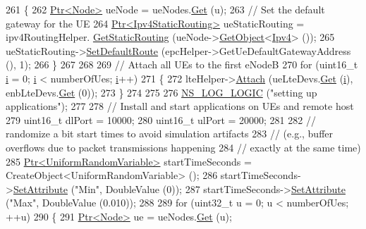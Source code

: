 \begin{DoxyCode}
261     \{
262       \hyperlink{classns3_1_1Ptr}{Ptr<Node>} ueNode = ueNodes.\hyperlink{classns3_1_1NodeContainer_a9ed96e2ecc22e0f5a3d4842eb9bf90bf}{Get} (u);
263       \textcolor{comment}{// Set the default gateway for the UE}
264       \hyperlink{classns3_1_1Ptr}{Ptr<Ipv4StaticRouting>} ueStaticRouting = ipv4RoutingHelper.
      \hyperlink{classns3_1_1Ipv4StaticRoutingHelper_a731206e50d305695dac7fb2ef963a4bb}{GetStaticRouting} (ueNode->\hyperlink{classns3_1_1Object_a13e18c00017096c8381eb651d5bd0783}{GetObject}<\hyperlink{classns3_1_1Ipv4}{Ipv4}> ());
265       ueStaticRouting->\hyperlink{classns3_1_1Ipv4StaticRouting_aee30fa3246c2b42f122dabdff2725331}{SetDefaultRoute} (epcHelper->GetUeDefaultGatewayAddress (), 1);
266     \}
267 
268 
269   \textcolor{comment}{// Attach all UEs to the first eNodeB}
270   \textcolor{keywordflow}{for} (uint16\_t \hyperlink{bernuolliDistribution_8m_a6f6ccfcf58b31cb6412107d9d5281426}{i} = 0; \hyperlink{bernuolliDistribution_8m_a6f6ccfcf58b31cb6412107d9d5281426}{i} < numberOfUes; \hyperlink{bernuolliDistribution_8m_a6f6ccfcf58b31cb6412107d9d5281426}{i}++)
271     \{
272       lteHelper->\hyperlink{classns3_1_1LteHelper_a9466743f826aa2652a87907b7f0a1c87}{Attach} (ueLteDevs.\hyperlink{classns3_1_1NetDeviceContainer_a677d62594b5c9d2dea155cc5045f4d0b}{Get} (\hyperlink{bernuolliDistribution_8m_a6f6ccfcf58b31cb6412107d9d5281426}{i}), enbLteDevs.\hyperlink{classns3_1_1NetDeviceContainer_a677d62594b5c9d2dea155cc5045f4d0b}{Get} (0));
273     \}
274 
275 
276   \hyperlink{group__logging_ga88acd260151caf2db9c0fc84997f45ce}{NS\_LOG\_LOGIC} (\textcolor{stringliteral}{"setting up applications"});
277 
278   \textcolor{comment}{// Install and start applications on UEs and remote host}
279   uint16\_t dlPort = 10000;
280   uint16\_t ulPort = 20000;
281 
282   \textcolor{comment}{// randomize a bit start times to avoid simulation artifacts}
283   \textcolor{comment}{// (e.g., buffer overflows due to packet transmissions happening}
284   \textcolor{comment}{// exactly at the same time)}
285   \hyperlink{classns3_1_1Ptr}{Ptr<UniformRandomVariable>} startTimeSeconds = 
      CreateObject<UniformRandomVariable> ();
286   startTimeSeconds->\hyperlink{classns3_1_1ObjectBase_ac60245d3ea4123bbc9b1d391f1f6592f}{SetAttribute} (\textcolor{stringliteral}{"Min"}, DoubleValue (0));
287   startTimeSeconds->\hyperlink{classns3_1_1ObjectBase_ac60245d3ea4123bbc9b1d391f1f6592f}{SetAttribute} (\textcolor{stringliteral}{"Max"}, DoubleValue (0.010));
288 
289   \textcolor{keywordflow}{for} (uint32\_t u = 0; u < numberOfUes; ++u)
290     \{
291       \hyperlink{classns3_1_1Ptr}{Ptr<Node>} ue = ueNodes.\hyperlink{classns3_1_1NodeContainer_a9ed96e2ecc22e0f5a3d4842eb9bf90bf}{Get} (u);

\end{DoxyCode}
